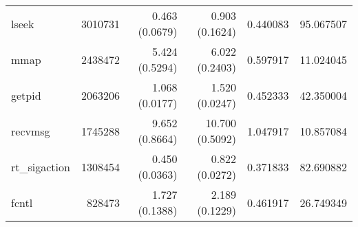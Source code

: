 \begin{tabular}{>{\ttfamily}lrrrrr}
                          lseek &   3010731 &           0.463 (0.0679) &           0.903 (0.1624) &        0.440083 &    95.067507 \\
                           mmap &   2438472 &           5.424 (0.5294) &           6.022 (0.2403) &        0.597917 &    11.024045 \\
                         getpid &   2063206 &           1.068 (0.0177) &           1.520 (0.0247) &        0.452333 &    42.350004 \\
                        recvmsg &   1745288 &           9.652 (0.8664) &          10.700 (0.5092) &        1.047917 &    10.857084 \\
                  rt\_sigaction &   1308454 &           0.450 (0.0363) &           0.822 (0.0272) &        0.371833 &    82.690882 \\
                          fcntl &    828473 &           1.727 (0.1388) &           2.189 (0.1229) &        0.461917 &    26.749349 \\
\bottomrule
\end{tabular}
